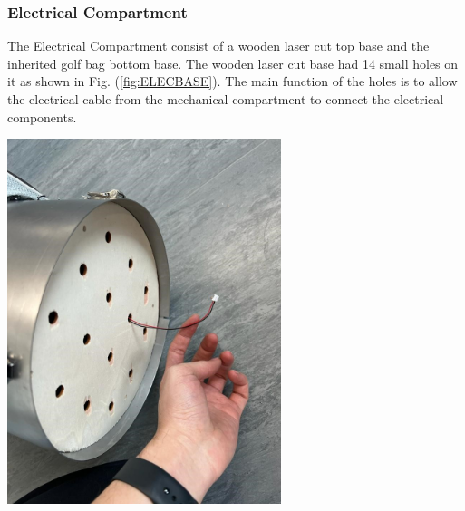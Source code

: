 \documentclass[11pt,landscape]{article}
\newenvironment{Figure}
  {\par\medskip\noindent\minipage{\linewidth}}
  {\endminipage\par\medskip}
\begin{document}
\begin{multicols}{3}
    \subsubsection{Electrical Compartment}
    The Electrical Compartment consist of a wooden laser cut top base and the
    inherited golf bag bottom base. The wooden laser cut base had 14 small holes
    on it as shown in Fig. (\ref{fig:ELECBASE}). The main function of the holes
    is to allow the electrical cable from the mechanical compartment to connect
    the electrical components.
    
    \begin{Figure}
        \begin{center}
            \includegraphics[width=0.6\textwidth]{Figure8.jpg}
            \label{fig:ELECBASE}
        \end{center}
    \end{Figure}
    
    
    

\end{multicols}
\end{document}
